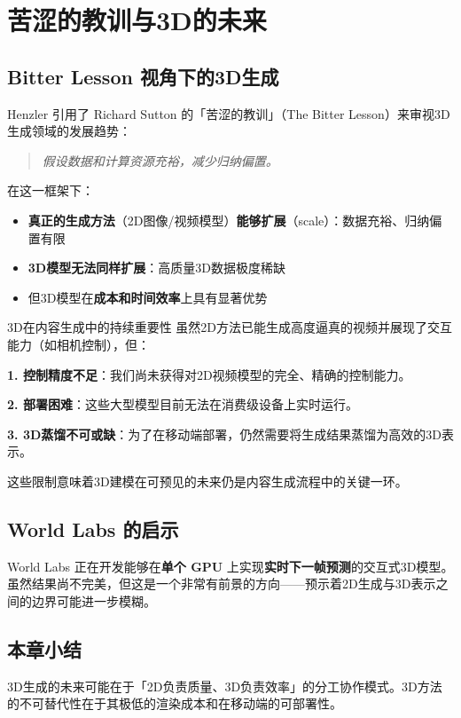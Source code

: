 \section{苦涩的教训与3D的未来}

\subsection{Bitter Lesson 视角下的3D生成}

Henzler 引用了 Richard Sutton 的「苦涩的教训」（The Bitter Lesson）来审视3D生成领域的发展趋势：

\begin{quote}
\textit{假设数据和计算资源充裕，减少归纳偏置。}
\end{quote}

在这一框架下：
\begin{itemize}
    \item \textbf{真正的生成方法}（2D图像/视频模型）\textbf{能够扩展}（scale）：数据充裕、归纳偏置有限
    \item \textbf{3D模型无法同样扩展}：高质量3D数据极度稀缺
    \item 但3D模型在\textbf{成本和时间效率}上具有显著优势
\end{itemize}

\begin{importantbox}{3D在内容生成中的持续重要性}
虽然2D方法已能生成高度逼真的视频并展现了交互能力（如相机控制），但：

\textbf{1. 控制精度不足}：我们尚未获得对2D视频模型的完全、精确的控制能力。

\textbf{2. 部署困难}：这些大型模型目前无法在消费级设备上实时运行。

\textbf{3. 3D蒸馏不可或缺}：为了在移动端部署，仍然需要将生成结果蒸馏为高效的3D表示。

这些限制意味着3D建模在可预见的未来仍是内容生成流程中的关键一环。
\end{importantbox}

\subsection{World Labs 的启示}

World Labs 正在开发能够在\textbf{单个 GPU} 上实现\textbf{实时下一帧预测}的交互式3D模型。虽然结果尚不完美，但这是一个非常有前景的方向——预示着2D生成与3D表示之间的边界可能进一步模糊。

\subsection{本章小结}

3D生成的未来可能在于「2D负责质量、3D负责效率」的分工协作模式。3D方法的不可替代性在于其极低的渲染成本和在移动端的可部署性。

